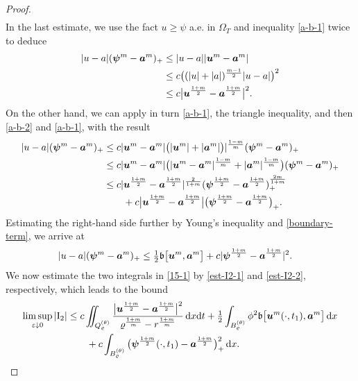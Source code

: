 \documentclass[a4paper, 10pt, american]{amsart}
\numberwithin{theorem}{section}
\numberwithin{equation}{section}
\newcommand{\dxdt}{\,\mathrm{d}x\mathrm{d}t}
\newcommand{\dx}{\,\mathrm{d}x}
\renewcommand{\epsilon}{\varepsilon}
\renewcommand{\epsilon}{\varepsilon}
\renewcommand{\rho}{\varrho}
\newcommand{\power}[2]{\bm{#1^{\mbox{\unboldmath{\scriptsize$#2$}}}}}
\begin{document}
\begin{proof}
\begin{align}
\end{align}
In the last estimate, we use the fact $u\ge \psi$ a.e. in $\Omega_T$
and inequality \eqref{a-b-1} twice to deduce 
\begin{align}\label{est-I2-1}
|u-a|(\power \psi m - \power am)_+ &\le |u-a||\power um-\power am| \nonumber\\
&\le c\big((|u|+ |a|)^{\frac{m-1}2}|u-a|\big)^2 \nonumber\\
&\le c\big|\power u{\frac{1+m}2}- \power a{\frac{1+m}2}\big|^2 .
\end{align}
On the other hand, we can apply in turn \eqref{a-b-1}, the triangle
inequality,  and then \eqref{a-b-2} and \eqref{a-b-1}, with the result
\begin{align*}
	|u-a|(\power{\psi}{m}-\power{a}{m})_+ 
	& \le  
	c|\power um-\power am|\big(|\power um|+|\power am|\big)|^{\frac{1-m}{m}}(\power \psi m-\power am)_+ \\
	& \le  
	c|\power um-\power am|\big(|\power um-\power am|^{\frac{1-m}{m}}+|\power am|^{\frac{1-m}{m}}\big)(\power \psi m-\power am)_+ \\
	& \le  
	c|\power u{\frac{1+m}2}-\power a{\frac{1+m}2}|^{\frac2{1+m}}(\power \psi{\frac{1+m}2}-\power a{\frac{1+m}2})_+^{\frac{2m}{1+m}} \\
	&\quad\quad+c\big|\power{u}{\frac{1+m}{2}}-\power{a}{\frac{1+m}{2}}\big| \big(\power{\psi}{\frac{1+m}{2}}-\power{a}{\frac{1+m}{2}}\big)_+ .
\end{align*} 
Estimating the right-hand side further by Young's inequality and
\eqref{boundary-term}, we arrive at 
\begin{align}\label{est-I2-2}
|u-a|(\power{\psi}{m}-\power{a}{m})_+ 
&\le \tfrac12 \mathfrak{b}\big[ \power um, \power am\big]+c|\power\psi{\frac{1+m}2}-\power{a}{\frac{1+m}2}|^2.
\end{align}
We now estimate the two integrals in \eqref{15-1} by \eqref{est-I2-1}
and \eqref{est-I2-2}, respectively, which leads to the bound
\begin{align}\label{15-2}
	\limsup_{\epsilon\downarrow0}|\mathrm{I}_2 |
	&\le 
	c\iint_{Q_\rho^{(\theta)}} 
	\frac{\big| \power u {\frac{1+m}2} - \power a {\frac{1+m}2} \big|^2}{\rho^{\frac{1+m}{m}}-r^{\frac{1+m}{m}}} \dxdt 
	+
	\tfrac12\int_{B_\rho^{(\theta)}} \phi^2  \mathfrak b\big[\power{u}{m}(\cdot,t_1), \power{a}{m}\big] \dx\nonumber\\
	&\quad\quad+
	c\int_{B_\rho^{(\theta)}}  \big( \power \psi {\frac{1+m}2}(\cdot,t_1) - \power a {\frac{1+m}2} \big)_+^2 \dx.
\end{align}

\end{proof}
\end{document}
